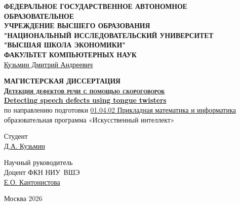 \begin{titlepage}
    \begin{center}
        {\footnotesize\bfseries
        ФЕДЕРАЛЬНОЕ ГОСУДАРСТВЕННОЕ АВТОНОМНОЕ ОБРАЗОВАТЕЛЬНОЕ\\
        УЧРЕЖДЕНИЕ ВЫСШЕГО ОБРАЗОВАНИЯ\\
        "НАЦИОНАЛЬНЫЙ ИССЛЕДОВАТЕЛЬСКИЙ УНИВЕРСИТЕТ\\
        "ВЫСШАЯ ШКОЛА ЭКОНОМИКИ"\\
        ФАКУЛЬТЕТ КОМПЬЮТЕРНЫХ НАУК}\\[6em]

        {
        \underline{Кузьмин Дмитрий Андреевич}\\[2em]
        }

        {\bfseries МАГИСТЕРСКАЯ ДИССЕРТАЦИЯ}\\[1em]

        {\bfseries
        \textsc{\underline{Детекция дефектов речи с помощью скороговорок}}\\
        \underline{Detecting speech defects using tongue twisters}
        }\\[3em]

        {по направлению подготовки \underline{01.04.02 Прикладная математика и информатика}\\
        образовательная программа «Искусственный интеллект»
        }\\[6em]
    \end{center}

    \begingroup
    \setlength{\parskip}{0pt}%
    \renewcommand{\baselinestretch}{1}\normalsize
    
    \noindent Студент\\[0.2em]
    \noindent \underline{Д.А. Кузьмин}\\[0.2em]
    
    \begin{flushright}
        Научный руководитель\\[0.2em]
        Доцент ФКН НИУ~ВШЭ\\[0.2em]
        \underline{Е.О. Кантонистова}
    \end{flushright}
    
    \endgroup

    \vfill

    \begin{center}
        {Москва 2026}
    \end{center}
\end{titlepage}